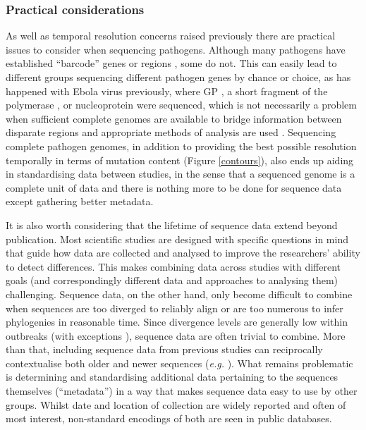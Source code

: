 \documentclass{bmcart}
\begin{document}
\subsubsection*{Practical considerations}
As well as temporal resolution concerns raised previously there are practical issues to consider when sequencing pathogens.
Although many pathogens have established ``barcode'' genes or regions \cite{towner_rapid_2004}, some do not.
This can easily lead to different groups sequencing different pathogen genes by chance or choice, as has happened with Ebola virus previously, where GP \cite{georges-courbot_isolation_1997}, a short fragment of the polymerase \cite{leroy_fruit_2005}, or nucleoprotein \cite{rouquet_wild_2005} were sequenced, which is not necessarily a problem when sufficient complete genomes are available to bridge information between disparate regions and appropriate methods of analysis are used \cite{dudas_phylogenetic_2014}.
Sequencing complete pathogen genomes, in addition to providing the best possible resolution temporally in terms of mutation content (Figure \ref{contours}), also ends up aiding in standardising data between studies, in the sense that a sequenced genome is a complete unit of data and there is nothing more to be done for sequence data except gathering better metadata.

It is also worth considering that the lifetime of sequence data extend beyond publication.
Most scientific studies are designed with specific questions in mind that guide how data are collected and analysed to improve the researchers' ability to detect differences.
This makes combining data across studies with different goals (and correspondingly different data and approaches to analysing them) challenging.
Sequence data, on the other hand, only become difficult to combine when sequences are too diverged to reliably align or are too numerous to infer phylogenies in reasonable time.
Since divergence levels are generally low within outbreaks (with exceptions \cite{andersen_clinical_2015}), sequence data are often trivial to combine.
More than that, including sequence data from previous studies can reciprocally contextualise both older and newer sequences (\textit{e.g.} \cite{mena_origins_2016}).
What remains problematic is determining and standardising additional data pertaining to the sequences themselves (``metadata'') in a way that makes sequence data easy to use by other groups.
Whilst date and location of collection are widely reported and often of most interest, non-standard encodings of both are seen in public databases.
\end{document}
